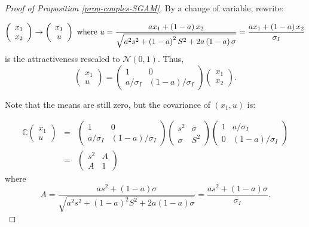\documentclass[
]{article}
\theoremstyle{definition}
\theoremstyle{definition}
\theoremstyle{definition}
\theoremstyle{definition}
\theoremstyle{remark}
\begin{document}
\begin{proof}[Proof of Proposition \ref{prop-couples-SGAM}]

By a change of variable, rewrite:

\[
\left( 
\begin{array}{c}
x_{1} \\ 
x_{2}%
\end{array}%
\right) \rightarrow \left( 
\begin{array}{c}
x_{1} \\ 
u%
\end{array}%
\right) \text{ where }u=\frac{ax_{1}+\left( 1-a\right) x_{2}}{\sqrt{%
a^{2}s^{2}+\left( 1-a\right) ^{2}S^{2}+2a\left( 1-a\right) \sigma }}=
\frac{ax_{1}+\left( 1-a\right) x_{2}}{\sigma_I}
\]
is the attractiveness rescaled to $\mathcal{N}(0, 1)$. Thus,
\[
\left( 
\begin{array}{c}
x_{1} \\ 
u
\end{array}
\right) = \left( 
\begin{array}{cc}
1 & 0 \\ 
a/\sigma_I & (1-a)/\sigma_I%
\end{array}%
\right) \left( 
\begin{array}{c}
x_{1} \\ 
x_{2}%
\end{array}%
\right). 
\]


Note that the means are still zero, but the covariance of $(x_1,u)$ is:

\begin{eqnarray*}
\mathbb{C}\left( 
\begin{array}{c}
x_{1} \\ 
u
\end{array}
\right) &=&\left( 
\begin{array}{cc}
1 & 0 \\ 
a/\sigma_I & \left( 1-a\right)/\sigma_I%
\end{array}%
\right) \left( 
\begin{array}{cc}
s^{2} & \sigma \\ 
\sigma & S^{2}%
\end{array}%
\right) \left( 
\begin{array}{cc}
1 & a/\sigma_I \\ 
0 & \left( 1-a\right)/\sigma_I%
\end{array}%
\right) \\
&=&\left( 
\begin{array}{cc}
s^{2} &  A \\ 
A & 1 
\end{array}%
\right) \allowbreak 
\end{eqnarray*}
where
\[
A=\frac{
as^{2}+\left( 1-a\right) \sigma 
}{
\sqrt{
a^{2}s^{2} + (1-a)^2S^{2}
+ 2a\left(1-a\right)\sigma 
}} = 
\frac{as^{2}+\left( 1-a\right) \sigma }{\sigma_I}.
\]


\end{proof}
\end{document}
